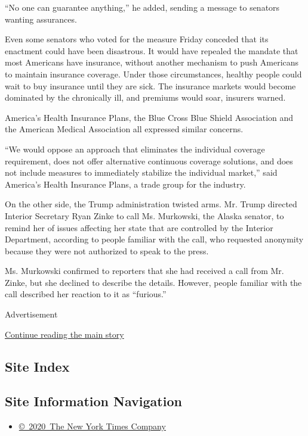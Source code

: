 ``No one can guarantee anything,'' he added, sending a message to
senators wanting assurances.

Even some senators who voted for the measure Friday conceded that its
enactment could have been disastrous. It would have repealed the mandate
that most Americans have insurance, without another mechanism to push
Americans to maintain insurance coverage. Under those circumstances,
healthy people could wait to buy insurance until they are sick. The
insurance markets would become dominated by the chronically ill, and
premiums would soar, insurers warned.

America's Health Insurance Plans, the Blue Cross Blue Shield Association
and the American Medical Association all expressed similar concerns.

``We would oppose an approach that eliminates the individual coverage
requirement, does not offer alternative continuous coverage solutions,
and does not include measures to immediately stabilize the individual
market,'' said America's Health Insurance Plans, a trade group for the
industry.

On the other side, the Trump administration twisted arms. Mr. Trump
directed Interior Secretary Ryan Zinke to call Ms. Murkowski, the Alaska
senator, to remind her of issues affecting her state that are controlled
by the Interior Department, according to people familiar with the call,
who requested anonymity because they were not authorized to speak to the
press.

Ms. Murkowski confirmed to reporters that she had received a call from
Mr. Zinke, but she declined to describe the details. However, people
familiar with the call described her reaction to it as ``furious.''

Advertisement

\protect\hyperlink{after-bottom}{Continue reading the main story}

\hypertarget{site-index}{%
\subsection{Site Index}\label{site-index}}

\hypertarget{site-information-navigation}{%
\subsection{Site Information
Navigation}\label{site-information-navigation}}

\begin{itemize}
\tightlist
\item
  \href{https://help.nytimes.com/hc/en-us/articles/115014792127-Copyright-notice}{©~2020~The
  New York Times Company}
\end{itemize}

